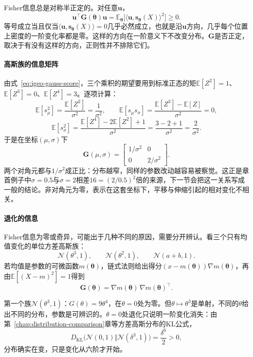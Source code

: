 Fisher信息总是对称半正定的。对任意$\bm{u}$，
\[
  \bm{u}^{\top}\bm{G}(\bm{\theta})\bm{u}=\mathbb{E}_{\bm{\theta}}\bigl[\langle\bm{u},\bm{s}_{\bm{\theta}}(X)\rangle^{2}\bigr]\geq0 .
\]
等号成立当且仅当$\langle\bm{u},\bm{s}_{\bm{\theta}}(X)\rangle=0$几乎必然成立，也就是沿$\bm{u}$方向，几乎每个位置上密度的一阶变化率都是零。这样的方向在一阶意义下不改变分布。$\bm{G}$是否正定，取决于有没有这样的方向，正则性并不排除它们。

\paragraph{高斯族的信息矩阵}
由式~\eqref{eq:igeo-gauss-score}，三个乘积的期望要用到标准正态的矩$\mathbb{E}[Z^{2}]=1$、$\mathbb{E}[Z^{3}]=0$、$\mathbb{E}[Z^{4}]=3$。逐项计算：
\[
  \mathbb{E}[s_{\mu}^{2}]=\frac{\mathbb{E}[Z^{2}]}{\sigma^{2}}=\frac{1}{\sigma^{2}},\qquad
  \mathbb{E}[s_{\mu}s_{\sigma}]=\frac{\mathbb{E}[Z^{3}]-\mathbb{E}[Z]}{\sigma^{2}}=0,
\]
\[
  \mathbb{E}[s_{\sigma}^{2}]=\frac{\mathbb{E}[Z^{4}]-2\mathbb{E}[Z^{2}]+1}{\sigma^{2}}=\frac{3-2+1}{\sigma^{2}}=\frac{2}{\sigma^{2}} .
\]
于是在坐标$(\mu,\sigma)$下
\begin{equation}
  \bm{G}(\mu,\sigma)=\begin{bmatrix}1/\sigma^{2}&0\\0&2/\sigma^{2}\end{bmatrix}.
  \label{eq:igeo-gauss-fisher}
\end{equation}
两个对角元都与$1/\sigma^{2}$成正比：分布越窄，同样的参数改动越容易被察觉。这正是章首例子中$\sigma=0.5$与$\sigma=2$相差$16=(2/0.5)^{2}$倍的来源，下一节会把这一关系写成一般的结论。非对角元为零，表示在这套坐标下，平移与伸缩引起的相对变化不相关。

\paragraph{退化的信息}
Fisher信息为零或奇异，可能出于几种不同的原因，需要分开辨认。看三个只有均值变化的单位方差高斯族：
\[
  \mathcal{N}(\theta^{3},1),\qquad\mathcal{N}(\theta^{2},1),\qquad\mathcal{N}(a+b,1).
\]
若均值是参数的可微函数$m(\bm{\theta})$，链式法则给出得分$(x-m(\bm{\theta}))\nabla m(\bm{\theta})$，再由$\mathbb{E}[(X-m)^{2}]=1$得到
\[
  \bm{G}(\bm{\theta})=\nabla m(\bm{\theta})\,\nabla m(\bm{\theta})^{\top}.
\]

第一个族$\mathcal{N}(\theta^{3},1)$：$G(\theta)=9\theta^{4}$，在$\theta=0$处为零。但$\theta\mapsto\theta^{3}$是单射，不同的$\theta$给出不同的分布，参数是可辨识的。$\theta=0$处退化只说明一阶变化消失：由第~\ref{chap:distribution-comparison}章等方差高斯分布的KL公式，
\[
  D_{\mathrm{KL}}\bigl(\mathcal{N}(0,1)\Vert\mathcal{N}(\delta^{3},1)\bigr)=\frac{\delta^{6}}{2}>0,
\]
分布确实在变，只是变化从六阶才开始。

